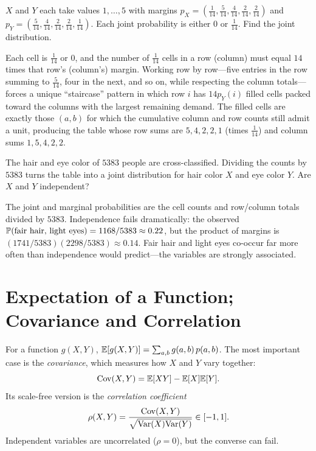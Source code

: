 \begin{example}
$X$ and $Y$ each take values $1,\dots,5$ with margins
$p_X=(\tfrac1{14},\tfrac5{14},\tfrac4{14},\tfrac2{14},\tfrac2{14})$ and
$p_Y=(\tfrac5{14},\tfrac4{14},\tfrac2{14},\tfrac2{14},\tfrac1{14})$. Each joint
probability is either $0$ or $\tfrac1{14}$. Find the joint distribution.

\solution Each cell is $\tfrac1{14}$ or $0$, and the number of $\tfrac1{14}$
cells in a row (column) must equal $14$ times that row's (column's) margin.
Working row by row—five entries in the row summing to $\tfrac5{14}$, four in the
next, and so on, while respecting the column totals—forces a unique
``staircase'' pattern in which row $i$ has $14p_Y(i)$ filled cells packed toward
the columns with the largest remaining demand. The filled cells are exactly
those $(a,b)$ for which the cumulative column and row counts still admit a unit,
producing the table whose row sums are $5,4,2,2,1$ (times $\tfrac1{14}$) and
column sums $1,5,4,2,2$.
\end{example}

\begin{example}
The hair and eye color of $5383$ people are cross-classified. Dividing the
counts by $5383$ turns the table into a joint distribution for hair color $X$
and eye color $Y$. Are $X$ and $Y$ independent?

\solution The joint and marginal probabilities are the cell counts and
row/column totals divided by $5383$. Independence fails dramatically: the
observed $\mathbb{P}(\text{fair hair, light eyes})=1168/5383\approx 0.22$, but the
product of margins is $(1741/5383)(2298/5383)\approx 0.14$. Fair hair and light
eyes co-occur far more often than independence would predict—the variables are
strongly associated.
\end{example}

\section{Expectation of a Function; Covariance and Correlation}

For a function $g(X,Y)$, $\mathbb{E}[g(X,Y)]=\sum_{a,b} g(a,b)\,p(a,b)$. The most
important case is the \emph{covariance}, which measures how $X$ and $Y$ vary
together:
\[
  \mathrm{Cov}(X,Y)=\mathbb{E}[XY]-\mathbb{E}[X]\mathbb{E}[Y].
\]
Its scale-free version is the \emph{correlation coefficient}
\[
  \rho(X,Y)=\frac{\mathrm{Cov}(X,Y)}{\sqrt{\mathrm{Var}(X)\mathrm{Var}(Y)}}\in[-1,1].
\]
Independent variables are uncorrelated ($\rho=0$), but the converse can fail.

